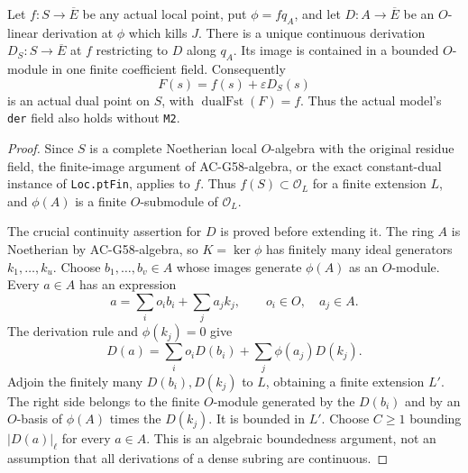 \begin{lemma}
\label{AC-G58-der}
Let $f:S\to\overline E$ be any actual local
point, put $\phi=fq_A$, and let
$D:A\to\overline E$ be an $O$-linear derivation
at $\phi$ which kills $J$.
There is a unique continuous derivation
$D_S:S\to\overline E$ at $f$ restricting to
$D$ along $q_A$.
Its image is contained in a bounded
$O$-module in one finite coefficient field.
Consequently
\[
                 F(s)=f(s)+\varepsilon D_S(s)
                                                               \tag{G58.8}
\]
is an actual dual point on $S$, with
$\operatorname{dualFst}(F)=f$.
Thus the actual model's \texttt{der} field
also holds without \texttt{M2}.
\end{lemma}
\begin{proof}
Since $S$ is a complete Noetherian local
$O$-algebra with the original residue field,
the finite-image argument of AC-G58-algebra,
or the exact constant-dual instance of
\texttt{Loc.ptFin}, applies to $f$.
Thus $f(S)\subset\mathcal O_L$ for a finite
extension $L$, and $\phi(A)$ is a finite
$O$-submodule of $\mathcal O_L$.

The crucial continuity assertion for $D$ is
proved before extending it.
The ring $A$ is Noetherian by AC-G58-algebra,
so $K=\ker\phi$ has finitely many ideal
generators $k_1,\ldots,k_u$.
Choose $b_1,\ldots,b_v\in A$ whose images
generate $\phi(A)$ as an $O$-module.
Every $a\in A$ has an expression
\[
                 a=\sum_i o_i b_i+\sum_j a_jk_j,
                    \qquad o_i\in O,\quad a_j\in A .
                                                               \tag{G58.9}
\]
The derivation rule and $\phi(k_j)=0$ give
\[
                 D(a)=\sum_i o_iD(b_i)
                              +\sum_j\phi(a_j)D(k_j).
                                                               \tag{G58.10}
\]
Adjoin the finitely many $D(b_i),D(k_j)$
to $L$, obtaining a finite extension $L'$.
The right side belongs to the finite
$O$-module generated by the $D(b_i)$ and
by an $O$-basis of $\phi(A)$ times the
$D(k_j)$.
It is bounded in $L'$.
Choose $C\geq1$ bounding $|D(a)|_\ell$
for every $a\in A$.
This is an algebraic boundedness argument,
not an assumption that all derivations of
a dense subring are continuous.


\end{proof}
